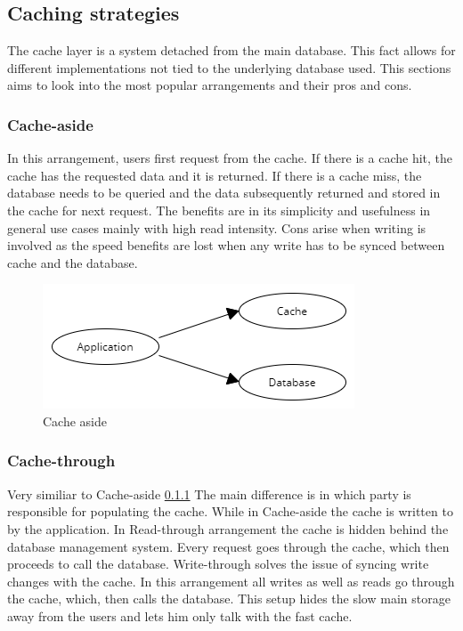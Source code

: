 \documentclass[10pt,a4paper]{article}
\begin{document}
\subsection{Caching strategies}
The cache layer is a system detached from the main database. This fact allows for different implementations not tied to the underlying database used. This sections aims to look into the most popular arrangements and their pros and cons. %

\subsubsection{Cache-aside}
\label{sec:cache-aside}
In this arrangement, users first request from the cache. If there is a cache hit, the cache has the requested data and it is returned. If there is a cache miss, the database needs to be queried and the data subsequently returned and stored in the cache for next request. The benefits are in its simplicity and usefulness in general use cases mainly with high read intensity. 
Cons arise when writing is involved as the speed benefits are lost when any write has to be synced between cache and the database.

\begin{figure}[h]
    \centering
    \includegraphics[width=0.5\linewidth]{Cache-aside.png}
    \caption{Cache aside}
    \label{fig:cache-aside}
\end{figure}

\subsubsection{Cache-through}
Very similiar to Cache-aside \ref{sec:cache-aside} The main difference is in which party is responsible for populating the cache. While in Cache-aside the cache is written to by the application. In Read-through arrangement the cache is hidden behind the database management system. Every request goes through the cache, which then proceeds to call the database. Write-through solves the issue of syncing write changes with the cache. In this arrangement all writes as well as reads go through the cache, which, then calls the database. This setup hides the slow main storage away from the users and lets him only talk with the fast cache.
\end{document}
